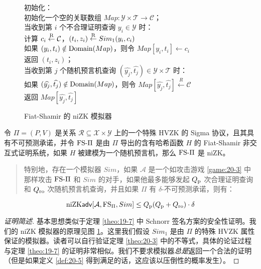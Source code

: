\begin{figure}
  \hspace*{95pt} 初始化：\\
  \hspace*{120pt} 初始化一个空的关联数组 $Map:\mathcal{Y}\times\mathcal{T}\to\mathcal{C}$；\\
  \hspace*{95pt} 当收到第 $i$ 个不合理证明查询 $y_i\in\mathcal{Y}$ 时：\\
  \hspace*{120pt} 计算 $c_i\overset{\rm R}\leftarrow\mathcal{C}$，$(t_i,z_i)\overset{\rm R}\leftarrow Sim_1(y_i,c_i)$\\
  \hspace*{120pt} 如果 $(y_i,t_i)\notin{\rm Domain}(Map)$，则令 $Map[y_i,t_i]\leftarrow c_i$\\
  \hspace*{120pt} 返回 $(t_i,z_i)$；\\
  \hspace*{95pt} 当收到第 $j$ 个随机预言机查询 $(\widehat{y_j},\widehat{t_j})\in\mathcal{Y}\times\mathcal{T}$ 时：\\
  \hspace*{120pt} 如果 $(\widehat{y_j},\widehat{t_j})\notin{\rm Domain}(Map)$，则令 $Map[\widehat{y_j},\widehat{t_j}]\overset{R}\leftarrow\mathcal{C}$\\
  \hspace*{120pt} 返回 $Map[\widehat{y_j},\widehat{t_j}]$
  \caption{Fiat-Shamir 的 niZK 模拟器}
  \label{fig:20-2}
\end{figure}

\begin{theorem}\label{theo:20-3}
令 $\Pi=(P,V)$ 是关系 $\mathcal{R}\subseteq\mathcal{X}\times\mathcal{Y}$ 上的一个特殊 HVZK 的 Sigma 协议，且其具有不可预测承诺，并令 ${\rm FS}\text{-}\Pi$ 是由 $\Pi$ 导出的含有哈希函数 $H$ 的 Fiat-Shamir 非交互式证明系统，如果 $H$ 被建模为一个随机预言机，那么 ${\rm FS}\text{-}\Pi$ 是 niZK。
\begin{quote}
特别地，存在一个模拟器 $Sim$，如果 $\mathcal{A}$ 是一个如攻击游戏 \ref{game:20-3} 中那样攻击 ${\rm FS}\text{-}\Pi$ 和 $Sim$ 的对手，如果他最多能够发起 $Q_{\rm p}$ 次合理证明查询和 $Q_{\rm ro}$ 次随机预言机查询，并且如果 $\Pi$ 有 $\delta$-不可预测承诺，则有：
\end{quote}
\begin{equation}
{\rm niZK\mathsf{adv}}[\mathcal{A},{\rm FS}_\Pi,Sim]\leq Q_{\rm p}(Q_{\rm p}+Q_{\rm ro})\cdot\delta
\end{equation}
\end{theorem}

\begin{proof}[证明简述]
基本思想类似于定理 \ref{theo:19-7} 中 Schnorr 签名方案的安全性证明。我们的 niZK 模拟器的原理见图 \ref{fig:20-2}。这里我们假设 $Sim_1$ 是由 $\Pi$ 的特殊 HVZK 属性保证的模拟器。读者可以自行验证定理 \ref{theo:20-3} 中的不等式，具体的论证过程与定理 \ref{theo:19-7} 的证明非常相似。我们不要求模拟器\emph{总是}返回一个合法的证明（但是如果定义 \ref{def:20-5} 得到满足的话，这应该以压倒性的概率发生）。
\end{proof}